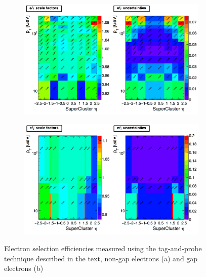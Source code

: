 
\begin{figure}[tbh]
\centering
\begin{subfigure}{0.95\textwidth}
\centering
\includegraphics[width=5in]{Figures/Electrons/ele_eff_sf_unc.pdf}
\caption{}
\end{subfigure}
\begin{subfigure}{0.95\textwidth}
\centering
\includegraphics[width=5in]{Figures/Electrons/gap_ele_eff_sf_unc.pdf}
\caption{}
\end{subfigure}
\caption{Electron selection efficiencies measured using the tag-and-probe technique described in the text, non-gap electrons (a) and gap electrons (b)}
\label{fig:ele_sel_scale_factors}
\end{figure}


